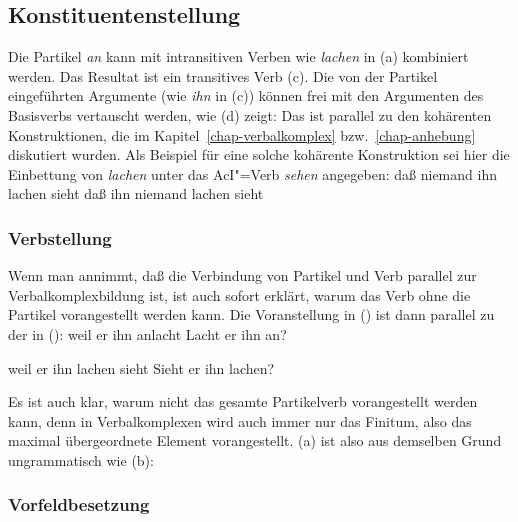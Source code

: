 \subsection{Konstituentenstellung}
\label{sec-linearization}%
\label{sec-partlinearization}
\label{sec-linearization-pv-mf}


Die Partikel \emph{an} kann mit intransitiven Verben
wie \emph{lachen} in (a) kombiniert werden. Das Resultat ist ein transitives Verb (c).
Die von der Partikel eingeführten Argumente (wie \zb \emph{ihn} in (c)) können frei
mit den Argumenten des Basisverbs vertauscht werden, wie (d) zeigt:
\eal
\label{ex-anlachen-perm-mf}
\zl
Das ist parallel zu den kohärenten Konstruktionen, die im Kapitel~\ref{chap-verbalkomplex}
bzw.~\ref{chap-anhebung} diskutiert wurden. Als Beispiel für eine solche kohärente Konstruktion
sei hier die Einbettung von \emph{lachen} unter das AcI"=Verb \emph{sehen} angegeben:
\eal
\ex daß niemand ihn lachen sieht
\ex daß ihn niemand lachen sieht
\zl


\subsubsection{Verbstellung}

Wenn man annimmt, daß die Verbindung von Partikel und Verb parallel zur Verbalkomplexbildung 
ist, ist auch sofort erklärt, warum das Verb ohne die Partikel vorangestellt werden kann. Die Voranstellung
in () ist dann parallel zu der in ():
\eal
\ex weil er ihn anlacht
\ex Lacht er ihn an?
\zl

\eal
\ex weil er ihn lachen sieht
\ex Sieht er ihn lachen?
\zl

\noindent
Es ist auch klar, warum nicht das gesamte Partikelverb vorangestellt werden kann,
denn in Verbalkomplexen wird auch immer nur das Finitum, also das maximal übergeordnete
Element vorangestellt. (a) ist also aus demselben Grund ungrammatisch wie (b):
\eal
{}
\zl

\subsubsection{Vorfeldbesetzung}
\label{sec-part-vorfeldbesetzung}

